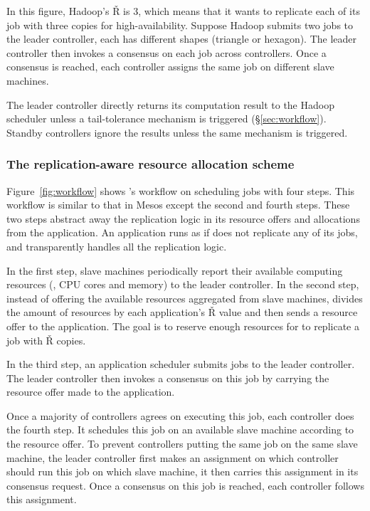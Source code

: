 In this figure, Hadoop's \v{R} is 3, which means that it wants to replicate 
each of its job with three copies for high-availability. Suppose Hadoop 
submits two jobs to the leader controller, each has different shapes (triangle 
or hexagon). The leader controller then invokes a consensus on each job across 
controllers. Once a consensus is reached, each controller assigns the same job 
on different slave machines.

The leader controller directly returns its computation result to the Hadoop 
scheduler unless a tail-tolerance mechanism is triggered 
(\S\ref{sec:workflow}). 
Standby controllers ignore the results unless the same mechanism is triggered.

\vspace{-.15in}\subsubsection{The replication-aware resource allocation scheme}
\label{sec:detect-arch}\vspace{-.075in}

Figure~\ref{fig:workflow} shows \xxx's workflow on scheduling jobs with four 
steps. This workflow is similar to that in Mesos except the second and fourth 
steps. These two steps \tripod abstract away the replication logic in its 
resource offers and allocations from the application. An application runs as if 
\xxx does not replicate any of its jobs, and \tripod transparently handles all 
the replication logic.

In the first step, slave machines periodically report their available computing 
resources (\eg, CPU cores and memory) to the leader controller. In the second 
step, instead of offering the available resources aggregated from slave 
machines, \tripod divides the amount of resources by each application's \v{R} 
value and then sends a resource offer to the application. The goal is to 
reserve enough resources for \tripod to replicate a job with \v{R} copies.

In the third step, an application scheduler submits jobs to the leader 
controller. The leader controller then invokes a consensus on this job by 
carrying the resource offer made to the application.

Once a majority of controllers agrees on executing this job, each controller 
does the fourth step. It schedules this job on an available slave machine 
according to the resource offer. To prevent controllers putting the same job on 
the same slave machine, the leader controller first makes an assignment on 
which controller should run this job on which slave machine, it then carries 
this assignment in its consensus request. Once a consensus on this job is 
reached, each controller follows this assignment.

